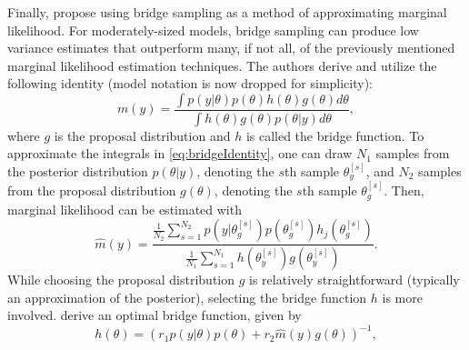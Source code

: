 \documentclass[twocolumn]{article}
\begin{document}
Finally, \cite{MengWong} propose using bridge sampling as a method of approximating marginal likelihood. For moderately-sized models, bridge sampling can produce low variance estimates that outperform many, if not all, of the previously mentioned marginal likelihood estimation techniques. The authors derive and utilize the following identity (model notation is now dropped for simplicity):
\begin{equation}
	\label{eq:bridgeIdentity}
	m(y) = \frac{\int p(y|\theta)p(\theta)h(\theta)g(\theta) d\theta}{\int h(\theta)g(\theta)p(\theta|y) d\theta},
\end{equation}
where $g$ is the proposal distribution and $h$ is called the bridge function. To approximate the integrals in \cref{eq:bridgeIdentity}, one can draw $N_1$ samples from the posterior distribution $p(\theta|y)$, denoting the $s$th sample $\theta_{y}^{[s]}$, and $N_2$ samples from the proposal distribution $g(\theta)$, denoting the $s$th sample $\theta_{g}^{[s]}$. Then, marginal likelihood can be estimated with
\begin{equation}
	\label{eq:bridgeEstimate}
	\hat{m}(y) = \frac{\frac{1}{N_2}\sum_{s=1}^{N_2} p\left(y|\theta_{g}^{[s]}\right)p\left(\theta_{g}^{[s]}\right)h_j\left(\theta_{g}^{[s]}\right)}{\frac{1}{N_1}\sum_{s=1}^{N_1} h\left(\theta_{y}^{[s]}\right)g\left(\theta_{y}^{[s]}\right)}.
\end{equation}
While choosing the proposal distribution $g$ is relatively straightforward (typically an approximation of the posterior), selecting the bridge function $h$ is more involved. \cite{MengWong} derive an optimal bridge function, given by
\begin{equation}
	\label{eq:bridgeFunction}
	h(\theta) = \left(r_1 p(y|\theta) p(\theta) + r_2 \hat{m}(y) g(\theta)\right)^{-1},
\end{equation}
\end{document}
